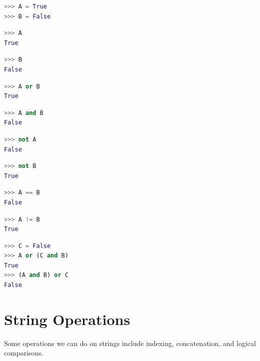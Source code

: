 \documentclass{book}
\begin{document}
    
        \begin{lstlisting}[language=Python]
>>> A = True
>>> B = False
\end{lstlisting}

\begin{lstlisting}[language=Python]
>>> A
True
\end{lstlisting}

\begin{lstlisting}[language=Python]
>>> B
False
\end{lstlisting}

\begin{lstlisting}[language=Python]
>>> A or B
True
\end{lstlisting}

\begin{lstlisting}[language=Python]
>>> A and B
False
\end{lstlisting}

\begin{lstlisting}[language=Python]
>>> not A
False
\end{lstlisting}

\begin{lstlisting}[language=Python]
>>> not B
True
\end{lstlisting}

\begin{lstlisting}[language=Python]
>>> A == B
False
\end{lstlisting}

\begin{lstlisting}[language=Python]
>>> A != B
True
\end{lstlisting}

\begin{lstlisting}[language=Python]
>>> C = False
>>> A or (C and B)
True
>>> (A and B) or C
False
\end{lstlisting}
    




    
        \section{String Operations}\label{string-operations}
    




    
        Some operations we can do on strings include indexing, concatenation,
and logical comparisons.
    
\end{document}
